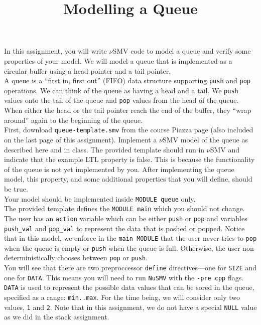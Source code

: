 \documentclass[12pt]{article}
\title{Modelling a Queue}
\date{}
\newenvironment{problem}[2][Problem]{\begin{trivlist}
\item[\hskip \labelsep {\bfseries #1}\hskip \labelsep {\bfseries #2.}]}{\end{trivlist}}
\begin{document}
\maketitle

\begin{problem}{1. A model of a queue} 

In this assignment, you will write $\nu$SMV code to model a queue and verify some properties of your model. We will model a queue that is implemented as a circular buffer using a head pointer and a tail pointer. \\

A queue is a ``first in, first out'' (FIFO) data structure supporting \texttt{push} and \texttt{pop} operations. We can think of the queue as having a head and a tail. We \texttt{push} values onto the tail of the queue and \texttt{pop} values from the head of the queue. When either the head or the tail pointer reach the end of the buffer, they ``wrap around'' again to the beginning of the queue. \\

First, download \texttt{queue-template.smv} from the course Piazza page (also included on the last page of this assignment). Implement a $\nu$SMV model of the queue as described here and in class. The provided template should run in $\nu$SMV and indicate that the example LTL property is false. This is because the functionality of the queue is not yet implemented by you. After implementing the queue model, this property, and some additional properties that you will define, should be true.\\

Your model should be implemented inside \texttt{MODULE queue} only. \\


The provided template defines the \texttt{MODULE main} which you should not change. The user has an \texttt{action} variable which can be either \texttt{push} or \texttt{pop} and variables \texttt{push\_val} and \texttt{pop\_val} to represent the data that is poshed or popped. Notice that in this model, we enforce in the \texttt{main MODULE} that the user never tries to \texttt{pop} when the queue is empty or \texttt{push} when the queue is full. Otherwise, the user non-deterministically chooses between \texttt{pop} or \texttt{push}. \\


You will see that there are two preproccessor \texttt{define} directives---one for \texttt{SIZE} and one for \texttt{DATA}. This means you will need to run \texttt{NuSMV} with the \texttt{-pre cpp} flags. \texttt{DATA} is used to represent the possible data values that can be sored in the queue, specified as a range: \texttt{min..max}. For the time being, we will consider only two values, \texttt{1} and \texttt{2}. Note that in this assignment, we do not have a special \texttt{NULL} value as we did in the stack assignment. \\


\end{problem}
\end{document}
